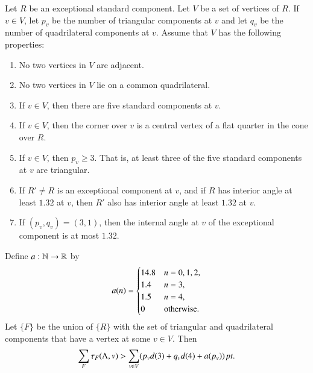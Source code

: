 \begin{lemma}\label{lemma:excess-1}
Let $R$ be an exceptional standard component.  Let $V$
be a set of vertices of $R$.  If $v\in V$, let $p_v$ be the number
of triangular components at $v$ and let $q_v$ be the number of
quadrilateral components at $v$.  Assume that $V$ has the following
properties:
    \begin{enumerate}
        \item No two
        vertices in $V$ are adjacent.
        \item No two vertices
        in $V$ lie on a common quadrilateral.
        \item If $v\in V$, then there are five standard components at
        $v$.
        \item If $v\in V$, then the corner over $v$ is a central
        vertex of a flat quarter in the cone over $R$.
        \item If $v\in V$, then $p_v\ge 3$.  That is, at least
        three of the five standard components at $v$ are triangular.
        \item If $R'\ne R$ is an exceptional component at $v$, and if $R$
        has interior angle at least $1.32$ at $v$, then $R'$ also has interior
        angle at least $1.32$ at $v$.
        \item If $(p_v,q_v)=(3,1)$, then the internal angle at $v$ of the exceptional
        component is at most $1.32$.
    \end{enumerate}
  Define $a:{\mathbb N}\to {\mathbb R}$ by
  $$a(n) = \begin{cases}
    14.8 &n=0,1,2,\\
    1.4 & n=3,\\
    1.5 & n=4,\\
    0 & \text{otherwise.}
  \end{cases}
  \index{aZ@$a(n)$}
  $$
Let $\{F\}$ be the union of $\{R\}$ with the set of triangular and
quadrilateral components that have a vertex at some $v\in V$. Then
    $$\sum_F\tau_F(\Lambda,v) > \sum_{v\in V} (p_v d(3) + q_v d(4) + a
    (p_v))\,\hbox{\it pt}.$$
\end{lemma}

